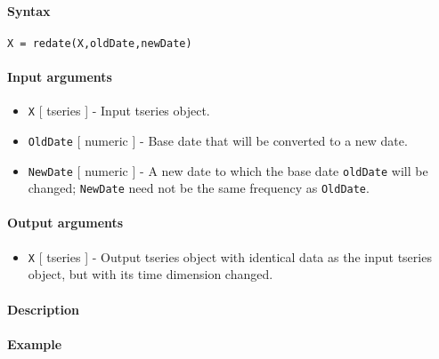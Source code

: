 


	\paragraph{Syntax}\label{syntax}

\begin{verbatim}
X = redate(X,oldDate,newDate)
\end{verbatim}

\paragraph{Input arguments}\label{input-arguments}

\begin{itemize}
\item
  \texttt{X} {[} tseries {]} - Input tseries object.
\item
  \texttt{OldDate} {[} numeric {]} - Base date that will be converted to
  a new date.
\item
  \texttt{NewDate} {[} numeric {]} - A new date to which the base date
  \texttt{oldDate} will be changed; \texttt{NewDate} need not be the
  same frequency as \texttt{OldDate}.
\end{itemize}

\paragraph{Output arguments}\label{output-arguments}

\begin{itemize}
\itemsep1pt\parskip0pt
\item
  \texttt{X} {[} tseries {]} - Output tseries object with identical data
  as the input tseries object, but with its time dimension changed.
\end{itemize}

\paragraph{Description}\label{description}

\paragraph{Example}\label{example}


